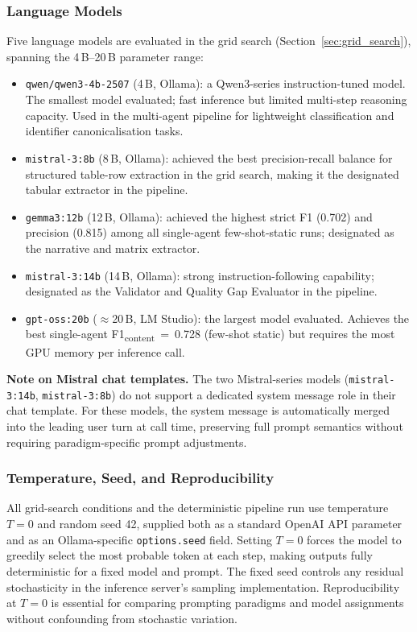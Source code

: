 ﻿\documentclass[11pt]{article}
\begin{document}
\subsubsection{Language Models}
Five language models are evaluated in the grid search
(Section~\ref{sec:grid_search}), spanning the 4\,B--20\,B parameter range:

\begin{itemize}
    \item \texttt{qwen/qwen3-4b-2507} (4\,B, Ollama): a Qwen3-series
          instruction-tuned model.
          The smallest model evaluated; fast inference but limited multi-step
          reasoning capacity.
          Used in the multi-agent pipeline for lightweight classification
          and identifier canonicalisation tasks.
    \item \texttt{mistral-3:8b} (8\,B, Ollama): achieved the best precision-recall
          balance for structured table-row extraction in the grid search, making
          it the designated tabular extractor in the pipeline.
    \item \texttt{gemma3:12b} (12\,B, Ollama): achieved the highest strict F1
          (0.702) and precision (0.815) among all single-agent few-shot-static
          runs; designated as the narrative and matrix extractor.
    \item \texttt{mistral-3:14b} (14\,B, Ollama): strong instruction-following
          capability; designated as the Validator and Quality Gap Evaluator in
          the pipeline.
    \item \texttt{gpt-oss:20b} (${\approx}$20\,B, LM Studio): the largest model
          evaluated.
          Achieves the best single-agent
          F1\textsubscript{content}~=~0.728 (few-shot static) but requires the
          most GPU memory per inference call.
\end{itemize}

\textbf{Note on Mistral chat templates.}
The two Mistral-series models (\texttt{mistral-3:14b}, \texttt{mistral-3:8b})
do not support a dedicated system message role in their chat template.
For these models, the system message is automatically merged into the leading
user turn at call time, preserving full prompt semantics without requiring
paradigm-specific prompt adjustments.

\subsubsection{Temperature, Seed, and Reproducibility}
All grid-search conditions and the deterministic pipeline run use temperature
$T = 0$ and random seed 42, supplied both as a standard OpenAI API parameter
and as an Ollama-specific \texttt{options.seed} field.
Setting $T = 0$ forces the model to greedily select the most probable token
at each step, making outputs fully deterministic for a fixed model and prompt.
The fixed seed controls any residual stochasticity in the inference server's
sampling implementation.
Reproducibility at $T = 0$ is essential for comparing prompting paradigms and
model assignments without confounding from stochastic variation.
\end{document}
